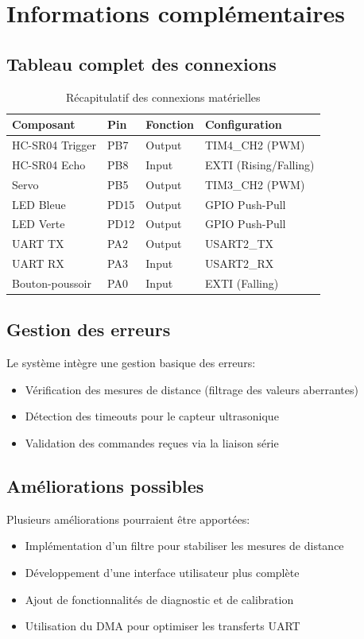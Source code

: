 \section{Informations complémentaires}

\subsection{Tableau complet des connexions}
\begin{table}[H]
\centering
\begin{tabular}{|l|l|l|l|}
\hline
\textbf{Composant} & \textbf{Pin} & \textbf{Fonction} & \textbf{Configuration} \\
\hline
HC-SR04 Trigger & PB7 & Output & TIM4\_CH2 (PWM) \\
\hline
HC-SR04 Echo & PB8 & Input & EXTI (Rising/Falling) \\
\hline
Servo & PB5 & Output & TIM3\_CH2 (PWM) \\
\hline
LED Bleue & PD15 & Output & GPIO Push-Pull \\
\hline
LED Verte & PD12 & Output & GPIO Push-Pull \\
\hline
UART TX & PA2 & Output & USART2\_TX \\
\hline
UART RX & PA3 & Input & USART2\_RX \\
\hline
Bouton-poussoir & PA0 & Input & EXTI (Falling) \\
\hline
\end{tabular}
\caption{Récapitulatif des connexions matérielles}
\label{tab:connections}
\end{table}

\subsection{Gestion des erreurs}
Le système intègre une gestion basique des erreurs:
\begin{itemize}
    \item Vérification des mesures de distance (filtrage des valeurs aberrantes)
    \item Détection des timeouts pour le capteur ultrasonique
    \item Validation des commandes reçues via la liaison série
\end{itemize}

\subsection{Améliorations possibles}
Plusieurs améliorations pourraient être apportées:
\begin{itemize}
    \item Implémentation d'un filtre pour stabiliser les mesures de distance
    \item Développement d'une interface utilisateur plus complète
    \item Ajout de fonctionnalités de diagnostic et de calibration
    \item Utilisation du DMA pour optimiser les transferts UART
\end{itemize}